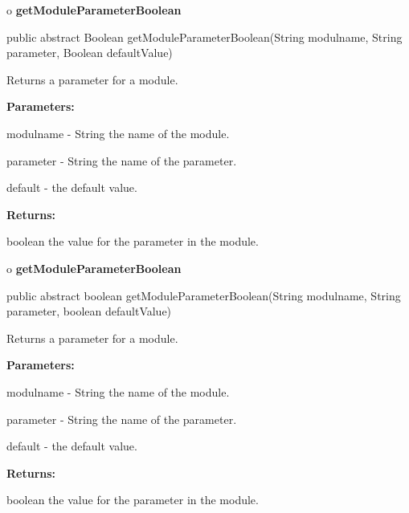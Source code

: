 o {\bf getModuleParameterBoolean} 

\begin{PRE}
 public abstract Boolean getModuleParameterBoolean(String modulname,
                                                   String parameter,
                                                   Boolean defaultValue)
\end{PRE}

\begin{description}
\htmlDD Returns a parameter for a module. 

\begin{description}
\item {\bf Parameters:}  

modulname - String the name of the module.  

parameter - String the name of the parameter.  

default - the default value.  
\item {\bf Returns:}  

boolean the value for the parameter in the module.  
\end{description}

\end{description}

o {\bf getModuleParameterBoolean} 

\begin{PRE}
 public abstract boolean getModuleParameterBoolean(String modulname,
                                                   String parameter,
                                                   boolean defaultValue)
\end{PRE}

\begin{description}
\htmlDD Returns a parameter for a module. 

\begin{description}
\item {\bf Parameters:}  

modulname - String the name of the module.  

parameter - String the name of the parameter.  

default - the default value.  
\item {\bf Returns:}  

boolean the value for the parameter in the module.  
\end{description}

\end{description}

